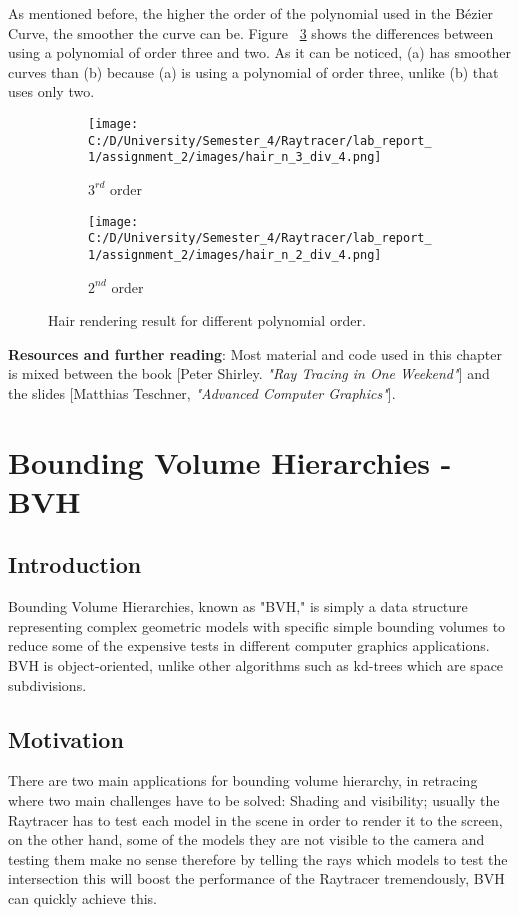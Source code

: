 \documentclass{article}
\begin{document}
	
	As mentioned before, the higher the order of the polynomial used in the Bézier Curve, the smoother the curve can be. Figure ~\ref{fig:11} shows the differences between using a polynomial of order three and two. As it can be noticed, (a) has smoother curves than (b) because (a) is using a polynomial of order three, unlike (b) that uses only two.
	\begin{figure}[H]
		\begin{center}
			\begin{subfigure}{.3\textwidth}
				\centering
				\texttt{[image: C:/D/University/Semester\_4/Raytracer/lab\_report\_1/assignment\_2/images/hair\_n\_3\_div\_4.png]}  
				\caption{$3^{rd}$ order}
				\label{fig:sub-first}
			\end{subfigure}
			\begin{subfigure}{.3\textwidth}
				\centering
				\texttt{[image: C:/D/University/Semester\_4/Raytracer/lab\_report\_1/assignment\_2/images/hair\_n\_2\_div\_4.png]}  
				\caption{$2^{nd}$ order}
				\label{fig:sub-second}
			\end{subfigure}
			\caption{Hair rendering result for different polynomial order.}
			\label{fig:11}
		\end{center}
	\end{figure}
	
	\textbf{Resources and further reading}: 
	Most material and code used in this chapter is mixed between the book [Peter Shirley. 	\textit{"Ray Tracing in One Weekend"}] and the slides 		[Matthias Teschner, 	\textit{"Advanced Computer Graphics"}].
	
	
	\clearpage
	\section{Bounding Volume Hierarchies - BVH}
	\subsection{Introduction}
	\label{definitions}
	Bounding Volume Hierarchies, known as "BVH," is simply a data structure representing complex geometric models with specific simple bounding volumes to reduce some of the expensive tests in different computer graphics applications.
	BVH is object-oriented, unlike other algorithms such as kd-trees which are space subdivisions.
	
	
	
	
	\subsection{Motivation}
	There are two main applications for bounding volume hierarchy, in retracing where two main challenges have to be solved: Shading and visibility; usually the Raytracer has to test each model in the scene in order to render it to the screen, on the other hand, some of the models they are not visible to the camera and testing them make no sense therefore by telling the rays which models to test the intersection this will boost the performance of the Raytracer tremendously, BVH can quickly achieve this.
	
\end{document}
